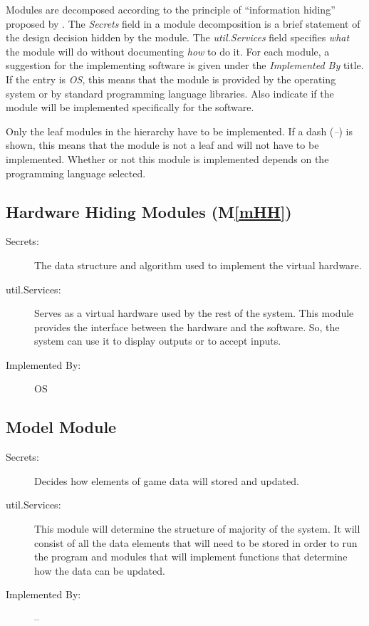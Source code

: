 \documentclass[12pt, titlepage]{article}
\newcommand{\mref}[1]{M\ref{#1}}
\begin{document}
Modules are decomposed according to the principle of ``information hiding''
proposed by \citet{ParnasEtAl1984}. The \emph{Secrets} field in a module
decomposition is a brief statement of the design decision hidden by the
module. The \emph{util.Services} field specifies \emph{what} the module will do
without documenting \emph{how} to do it. For each module, a suggestion for the
implementing software is given under the \emph{Implemented By} title. If the
entry is \emph{OS}, this means that the module is provided by the operating
system or by standard programming language libraries.  Also indicate if the
module will be implemented specifically for the software.

Only the leaf modules in the
hierarchy have to be implemented. If a dash (\emph{--}) is shown, this means
that the module is not a leaf and will not have to be implemented. Whether or
not this module is implemented depends on the programming language
selected.

\subsection{Hardware Hiding Modules (\mref{mHH})}

\begin{description}
\item[Secrets:]The data structure and algorithm used to implement the virtual
  hardware.
\item[util.Services:]Serves as a virtual hardware used by the rest of the
  system. This module provides the interface between the hardware and the
  software. So, the system can use it to display outputs or to accept inputs.
\item[Implemented By:] OS
\end{description}


\subsection{Model Module}
    \begin{description}
    \item[Secrets:] Decides how elements of game data will stored and updated.
    \item[util.Services:] This module will determine the structure of majority of the system. It will consist of all the data elements that will need to be stored in order to run the program and modules that will implement functions that determine how the data can be updated.
    \item[Implemented By:] --
    \end{description}
\end{document}
